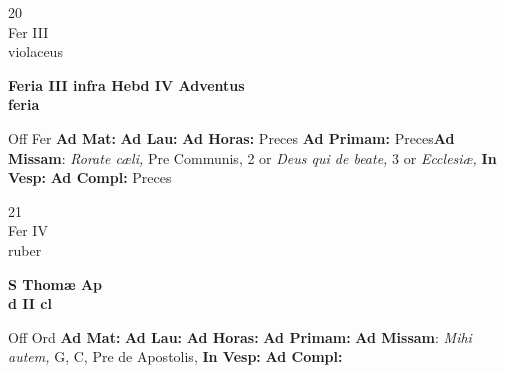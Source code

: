 \documentclass[10pt, openany]{book}
\begin{document}
    \begin{center}
        \begin{minipage}{3.5in}
            \vspace{2em}
            \begin{minipage}{0.5in}
                {\Huge 20} \\
                {\normalsize Fer III} \\
                {\normalsize violaceus}
            \end{minipage}
            \begin{minipage}{3.0in}
                \textbf{ \large Feria III infra Hebd IV Adventus \\
                \textnormal{\normalsize feria}} \\ 
            \end{minipage}
            \begin{justify}Off Fer
                \textbf{Ad Mat: }
                \textbf{Ad Lau: }
                \textbf{Ad Horas: }Preces
                \textbf{Ad Primam: }Preces\textbf{Ad Missam}: \textit{Rorate cæli,} Pre Communis, 2 or \textit{Deus qui de beate,} 3 or \textit{Ecclesiæ,}  
                \textbf{In Vesp: }
                \textbf{Ad Compl: }Preces
            \end{justify}
        \end{minipage}
    \end{center}

    \begin{center}
        \begin{minipage}{3.5in}
            \vspace{2em}
            \begin{minipage}{0.5in}
                {\Huge 21} \\
                {\normalsize Fer IV} \\
                {\normalsize ruber}
            \end{minipage}
            \begin{minipage}{3.0in}
                \textbf{ \large S Thomæ Ap \\
                \textnormal{\normalsize d II cl}} \\ 
            \end{minipage}
            \begin{justify}Off Ord
                \textbf{Ad Mat: }
                \textbf{Ad Lau: }
                \textbf{Ad Horas: }
                \textbf{Ad Primam: }\textbf{Ad Missam}: \textit{Mihi autem,} G, C, Pre de Apostolis,  
                \textbf{In Vesp: }
                \textbf{Ad Compl: }
            \end{justify}
        \end{minipage}
    \end{center}
\end{document}
